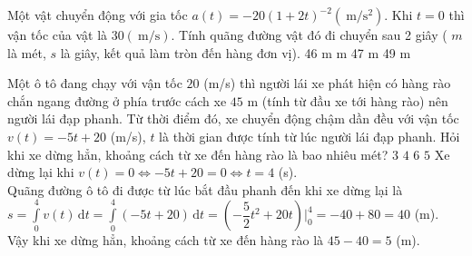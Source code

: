 \begin{ex}
	Một vật chuyển động với gia tốc $a(t)=-20(1+2 t)^{-2}\left(\mathrm{~m} / \mathrm{s}^2\right)$. Khi $t=0$ thì vận tốc của vật là $30(\mathrm{~m} / \mathrm{s})$. Tính quãng đường vật đó đi chuyển sau 2 giây ( $m$ là mét, $s$ là giây, kết quả làm tròn đến hàng đơn vị).
	\choice
	{46 m}
	{ m}
	{47 m}
	{49 m}
\end{ex}
\begin{ex}
	Một ô tô đang chạy với vận tốc $20$ (m/s) thì người lái xe phát hiện có hàng rào chắn ngang đường ở phía trước cách xe $45$ m (tính từ đầu xe tới hàng rào) nên người lái đạp phanh. Từ thời điểm đó, xe chuyển động chậm dần đều với vận tốc $v(t)=-5t+20$ (m/s), $t$ là thời gian được tính từ lúc người lái đạp phanh. Hỏi khi xe dừng hẳn, khoảng cách từ xe đến hàng rào là bao nhiêu mét?
	\choice
	{$3$}
	{$4$}
	{$6$}
	{\True $5$}
	\loigiai
	{Xe dừng lại khi $v(t)=0\Leftrightarrow -5t+20=0\Leftrightarrow t=4$ (s).\\
		Quãng đường ô tô đi được từ lúc bắt đầu phanh đến khi xe dừng lại là\\
		$s=\displaystyle\int\limits_0^4 v(t)\mathrm{\,d}t =\displaystyle\int\limits_0^4 (-5t+20)\mathrm{\,d}t =\left(-\dfrac{5}{2}t^2+20t\right)\bigg|_0^4=-40+80=40$ (m).\\
		Vậy khi xe dừng hẳn, khoảng cách từ xe đến hàng rào là $45-40=5$ (m).}
\end{ex}

